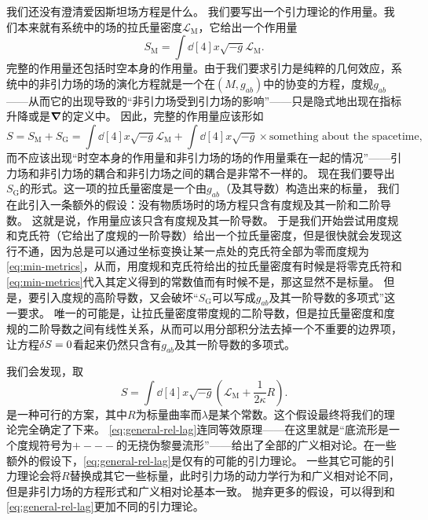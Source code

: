 \documentclass[hyperref, UTF8, a4paper]{ctexart}
\begin{document}
我们还没有澄清爱因斯坦场方程是什么。
我们要写出一个引力理论的作用量。我们本来就有系统中的场的拉氏量密度$\mathcal{L}_\text{M}$，它给出一个作用量
\[
    S_\text{M} = \int \dd[4]{x} \sqrt{-g} \mathcal{L}_\text{M}.
\]
完整的作用量还包括时空本身的作用量。由于我们要求引力是纯粹的几何效应，系统中的非引力场的场的演化方程就是一个在$(M, g_{ab})$中的协变的方程，度规$g_{ab}$——从而它的出现导致的“非引力场受到引力场的影响”——只是隐式地出现在指标升降或是$\grad$的定义中。
因此，完整的作用量应该形如
\[
    S = S_\text{M} + S_\text{G} = \int \dd[4]{x} \sqrt{-g} \mathcal{L}_\text{M} + \int \dd[4]{x} \sqrt{-g} \times \text{something about the spacetime},
\]
而不应该出现“时空本身的作用量和非引力场的场的作用量乘在一起的情况”——引力场和非引力场的耦合和非引力场之间的耦合是非常不一样的。
现在我们要导出$S_\text{G}$的形式。这一项的拉氏量密度是一个由$g_{ab}$（及其导数）构造出来的标量，
我们在此引入一条额外的假设：没有物质场时的场方程只含有度规及其一阶和二阶导数。
这就是说，作用量应该只含有度规及其一阶导数。
于是我们开始尝试用度规和克氏符（它给出了度规的一阶导数）给出一个拉氏量密度，但是很快就会发现这行不通，因为总是可以通过坐标变换让某一点处的克氏符全部为零而度规为\eqref{eq:min-metrics}，从而，用度规和克氏符给出的拉氏量密度有时候是将零克氏符和\eqref{eq:min-metrics}代入其定义得到的常数值而有时候不是，那这显然不是标量。
但是，要引入度规的高阶导数，又会破坏“$S_\text{G}$可以写成$g_{ab}$及其一阶导数的多项式”这一要求。
唯一的可能是，让拉氏量密度带度规的二阶导数，但是拉氏量密度和度规的二阶导数之间有线性关系，从而可以用分部积分法去掉一个不重要的边界项，让方程$\var{S} = 0$看起来仍然只含有$g_{ab}$及其一阶导数的多项式。

我们会发现，取
\begin{equation}
    S = \int \dd[4]{x} \sqrt{-g} \left(\mathcal{L}_\text{M} + \frac{1}{2\kappa} R \right).
    \label{eq:general-rel-lag}
\end{equation}
是一种可行的方案，其中$R$为标量曲率而$\lambda$是某个常数。这个假设最终将我们的理论完全确定了下来。
\eqref{eq:general-rel-lag}连同等效原理——在这里就是“底流形是一个度规符号为$+---$的无挠伪黎曼流形”——给出了全部的广义相对论。在一些额外的假设下，\eqref{eq:general-rel-lag}是仅有的可能的引力理论。
一些其它可能的引力理论会将$R$替换成其它一些标量，此时引力场的动力学行为和广义相对论不同，但是非引力场的方程形式和广义相对论基本一致。
抛弃更多的假设，可以得到和\eqref{eq:general-rel-lag}更加不同的引力理论。
\end{document}
